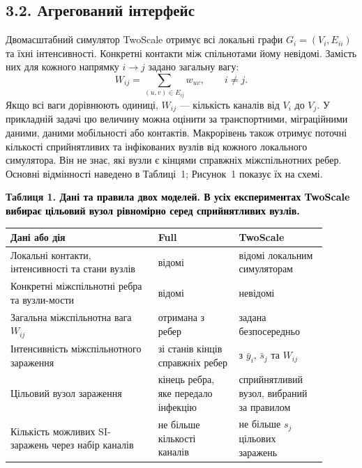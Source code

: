\documentclass[11pt,a4paper]{article}
\newcommand{\ibar}{\bar{y}}
\newcommand{\sbar}{\bar{s}}
\newcommand{\Full}{\textnormal{Full}}
\newcommand{\TS}{\textnormal{TwoScale}}
\begin{document}
\subsection*{3.2. Агрегований інтерфейс}

Двомасштабний симулятор \TS{} отримує всі локальні графи $G_i=(V_i,E_{ii})$ та їхні інтенсивності. Конкретні контакти між спільнотами йому невідомі. Замість них для кожного напрямку $i\to j$ задано загальну вагу:
\begin{equation*}W_{ij}=\sum_{(u,v)\in E_{ij}}w_{uv},\qquad i\neq j.\tag{3}
\end{equation*}
Якщо всі ваги дорівнюють одиниці, $W_{ij}$ --- кількість каналів від $V_i$ до $V_j$. У прикладній задачі цю величину можна оцінити за транспортними, міграційними даними, даними мобільності або контактів. Макрорівень також отримує поточні кількості сприйнятливих та інфікованих вузлів від кожного локального симулятора. Він не знає, які вузли є кінцями справжніх міжспільнотних ребер. Основні відмінності наведено в Таблиці~1; Рисунок~1 показує їх на схемі.
\par\noindent\begin{minipage}{\linewidth}
\color{black}\centering
\par\small\textbf{Таблиця 1. \textcolor{black}{Дані та правила двох моделей. В усіх експериментах \TS{} вибирає цільовий вузол рівномірно серед сприйнятливих вузлів.}}

\small
\setlength{\tabcolsep}{3pt}\begin{tabular}{>{\raggedright\arraybackslash}p{0.42\linewidth}>{\raggedright\arraybackslash}p{0.23\linewidth}>{\raggedright\arraybackslash}p{0.25\linewidth}}
\toprule
Дані або дія & \Full{} & \TS{}\\
\midrule
Локальні контакти, інтенсивності та стани вузлів & відомі & відомі локальним симуляторам\\
Конкретні міжспільнотні ребра та вузли-мости & відомі & невідомі\\
Загальна міжспільнотна вага $W_{ij}$ & отримана з ребер & задана безпосередньо\\
Інтенсивність міжспільнотного зараження & зі станів кінців справжніх ребер & з $\ibar_i$, $\sbar_j$ та $W_{ij}$\\
Цільовий вузол зараження & кінець ребра, яке передало інфекцію & сприйнятливий вузол, вибраний за правилом\\
Кількість можливих SI-заражень через набір каналів & не більше кількості каналів & не більше $s_j$ цільових заражень\\
\bottomrule
\end{tabular}
\end{minipage}\par
\end{document}
